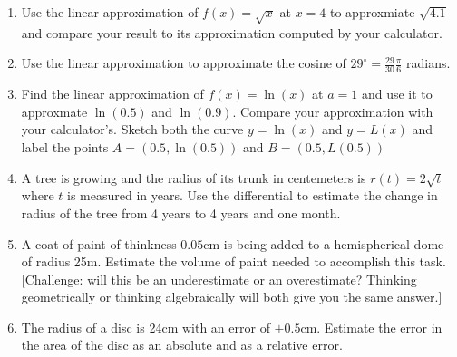 \documentclass[11pt,fleqn]{article}
\begin{document}
\setlength{\parindent}{0cm}
\renewcommand{\headrulewidth}{0pt}
\newcommand{\blank}[1]{\rule{#1}{0.75pt}}
\renewcommand{\d}{\displaystyle}
\vspace*{-0.7in}
\begin{center}
 {\large{ }}
\end{center}

\begin{enumerate}
\item Use the linear approximation of $f(x)=\sqrt{x}$ at $x=4$
to approxmiate $\sqrt{4.1}$ and compare your result to its approximation
computed by your calculator.
\vfill

\item  Use the linear approximation to approximate the cosine of $29^\circ=\frac{29}{30}\frac{\pi}{6}$ radians.
\vfill

\item  Find the linear approximation of $f(x)=\ln(x)$ at $a=1$ and use it to approxmate $\ln(0.5)$ and $\ln(0.9)$.  Compare your approximation with your calculator's.
Sketch both the curve $y=\ln(x)$ and $y=L(x)$ and label the points $A=(0.5,\ln(0.5))$ and $B=(0.5,L(0.5))$
\vfill
\newpage

\item A tree is growing and the radius of its trunk in centemeters
is $r(t)=2\sqrt{t}$ where $t$ is measured in years.  Use the differential
to estimate the change in radius of the tree from 4 years to  
4 years and one month.
\vfill

\item  A coat of paint of thinkness $0.05$cm is being added 
to a hemispherical dome of radius 25m.  Estimate the volume
of paint needed to accomplish this task. [Challenge: will this be an underestimate or an overestimate? Thinking geometrically or thinking algebraically will both give you the same answer.]
\vfill
\item  The radius of a disc is 24cm with an error of $\pm 0.5$cm.
Estimate the error in the area of the disc as an absolute and
as a relative error.
\end{enumerate}
\end{document}
